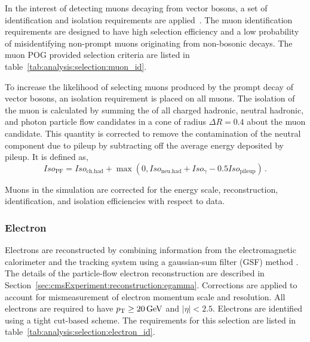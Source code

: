 In the interest of detecting muons decaying from vector bosons, a set of identification and isolation requirements are applied~\cite{Sirunyan:2018fpa}. The muon identification requirements are designed to have high selection efficiency and a low probability of misidentifying non-prompt muons originating from non-bosonic decays. The muon POG provided selection criteria are listed in table~\ref{tab:analysis:selection:muon_id}.



\noindent To increase the likelihood of selecting muons produced by the prompt decay of vector bosons, an isolation requirement is placed on all muons. The isolation of the muon is calculated by summing the \pt of all charged hadronic, neutral hadronic, and photon particle flow candidates in a cone of radius $\Delta R = 0.4$ about the muon candidate. This quantity is corrected to remove the contamination of the neutral component due to pileup by subtracting off the average energy deposited by pileup. It is defined as,
\begin{equation*} 
    Iso_\mathrm{PF} = Iso_\mathrm{ ch. had} + \max\left(0, Iso_\mathrm{ neu. had} + Iso_{\gamma} - 0.5 Iso_\mathrm{ pileup}\right)\,.
\end{equation*}

\noindent Muons in the simulation are corrected for the energy scale, reconstruction, identification, and isolation efficiencies with respect to data.







\subsubsection{Electron}

Electrons are reconstructed by combining information from the electromagnetic calorimeter and the tracking system using a gaussian-sum filter (GSF) method \cite{Baffioni:2006cd}. The details of the particle-flow electron reconstruction are described in Section~\ref{sec:cmsExperiment:reconstruction:egamma}. Corrections are applied to account for mismeasurement of electron momentum scale and resolution. All electrons are required to have $p_{\mathrm{T}} \geq 20 \,\text{Ge\hspace{-.08em}V}$ and $|\eta| < 2.5$.  Electrons are identified using a tight cut-based scheme. The requirements for this selection are listed in table~\ref{tab:analysis:selection:electron_id}.

